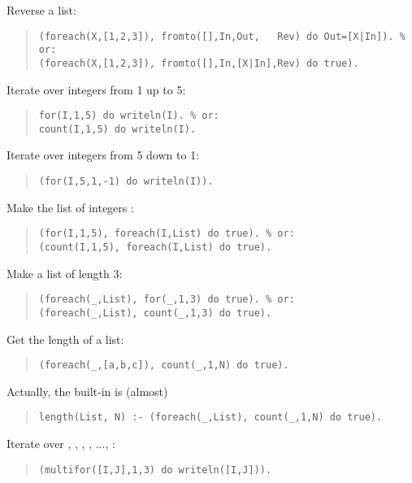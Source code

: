 Reverse a list:
\begin{quote}
\begin{verbatim}
(foreach(X,[1,2,3]), fromto([],In,Out,   Rev) do Out=[X|In]). % or:
(foreach(X,[1,2,3]), fromto([],In,[X|In],Rev) do true).
\end{verbatim}
\end{quote}

Iterate over integers from 1 up to 5:
\begin{quote}
\begin{verbatim}
for(I,1,5) do writeln(I). % or:
count(I,1,5) do writeln(I).
\end{verbatim}
\end{quote}

Iterate over integers from 5 down to 1:
\begin{quote}
\begin{verbatim}
(for(I,5,1,-1) do writeln(I)).
\end{verbatim}
\end{quote}

Make the list of integers \notation{[1,2,3,4,5]}:
\begin{quote}
\begin{verbatim}
(for(I,1,5), foreach(I,List) do true). % or:
(count(I,1,5), foreach(I,List) do true).
\end{verbatim}
\end{quote}

Make a list of length 3:
\begin{quote}
\begin{verbatim}
(foreach(_,List), for(_,1,3) do true). % or:
(foreach(_,List), count(_,1,3) do true).
\end{verbatim}
\end{quote}

Get the length of a list:
\begin{quote}
\begin{verbatim}
(foreach(_,[a,b,c]), count(_,1,N) do true).
\end{verbatim}
\end{quote}

Actually, the  built-in is (almost)
\begin{quote}
\begin{verbatim}
length(List, N) :- (foreach(_,List), count(_,1,N) do true).
\end{verbatim}
\end{quote}

Iterate \notation{[I,J]} over \notation{[1,1]}, \notation{[1,2]},
 \notation{[1,3]}, \notation{[2,1]}, ..., \notation{[3,3]}:
\begin{quote}
\begin{verbatim}
(multifor([I,J],1,3) do writeln([I,J])).
\end{verbatim}
\end{quote}

